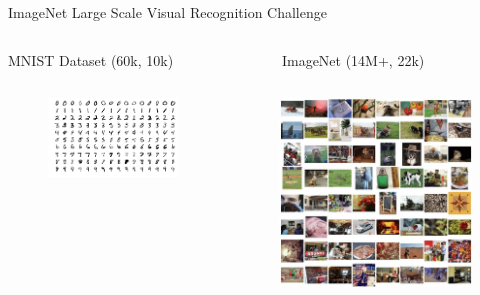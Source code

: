 \begin{frame}[allowframebreaks]{ImageNet Large Scale Visual Recognition Challenge}
	\begin{columns}
		\begin{column}{.5\textwidth}
			\begin{center}
				MNIST Dataset (60k, 10k)
			\end{center}
		\end{column}
		\begin{column}{.5\textwidth}
			\begin{center}
				ImageNet (14M+, 22k)
			\end{center}
		\end{column}
	\end{columns}
	\begin{columns}
		\begin{column}{.5\textwidth}
			\begin{figure}
				\includegraphics[width=1\textwidth, center]{figures/MnistExamples}
				\caption*{}
			\end{figure}
		\end{column}
		\begin{column}{.5\textwidth}
			\begin{figure}
			\includegraphics[width=.8\textwidth, center]{figures/Examples-in-the-ImageNet-dataset}
			\caption*{}
		\end{figure}
		\end{column}
	\end{columns}


\end{frame}
